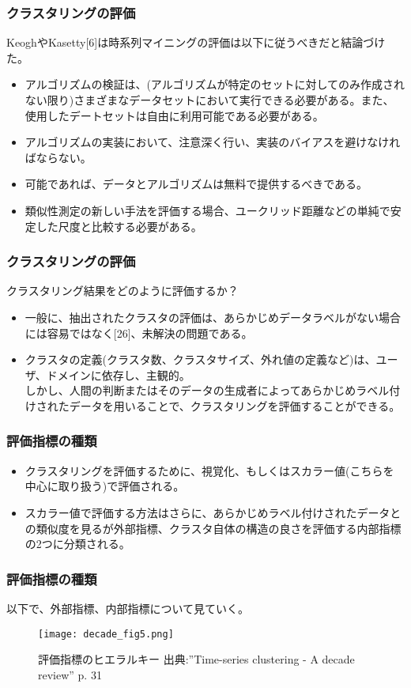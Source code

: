 \documentclass[dvipdfmx,11pt,notheorems]{beamer}
\theoremstyle{definition}
\begin{document}
\begin{frame}\frametitle{クラスタリングの評価}
KeoghやKasetty[6]は時系列マイニングの評価は以下に従うべきだと結論づけた。
\begin{itemize}
\item アルゴリズムの検証は、(アルゴリズムが特定のセットに対してのみ作成されない限り)さまざまなデータセットにおいて実行できる必要がある。また、使用したデートセットは自由に利用可能である必要がある。
\item アルゴリズムの実装において、注意深く行い、実装のバイアスを避けなければならない。
\item 可能であれば、データとアルゴリズムは無料で提供するべきである。
\item 類似性測定の新しい手法を評価する場合、ユークリッド距離などの単純で安定した尺度と比較する必要がある。
\end{itemize}
\end{frame}


\begin{frame}\frametitle{クラスタリングの評価}
クラスタリング結果をどのように評価するか？\newline
\newline
\begin{itemize}
\item 一般に、抽出されたクラスタの評価は、あらかじめデータラベルがない場合には容易ではなく[26]、未解決の問題である。
\item クラスタの定義(クラスタ数、クラスタサイズ、外れ値の定義など)は、ユーザ、ドメインに依存し、主観的。\\しかし、人間の判断またはそのデータの生成者によってあらかじめラベル付けされたデータを用いることで、クラスタリングを評価することができる。
\end{itemize}
\end{frame}


\begin{frame}\frametitle{評価指標の種類}
\begin{itemize}
\item クラスタリングを評価するために、視覚化、もしくはスカラー値(こちらを中心に取り扱う)で評価される。
\item スカラー値で評価する方法はさらに、あらかじめラベル付けされたデータとの類似度を見るが外部指標、クラスタ自体の構造の良さを評価する内部指標の2つに分類される。
\end{itemize}
\end{frame}


\begin{frame}\frametitle{評価指標の種類}
以下で、外部指標、内部指標について見ていく。
\begin{figure}[h]
\begin{center}
\texttt{[image: decade\_fig5.png]}
\end{center}
\caption{評価指標のヒエラルキー 出典:''Time-series clustering - A decade review'' p. 31}
\end{figure}
\end{frame}
\end{document}
